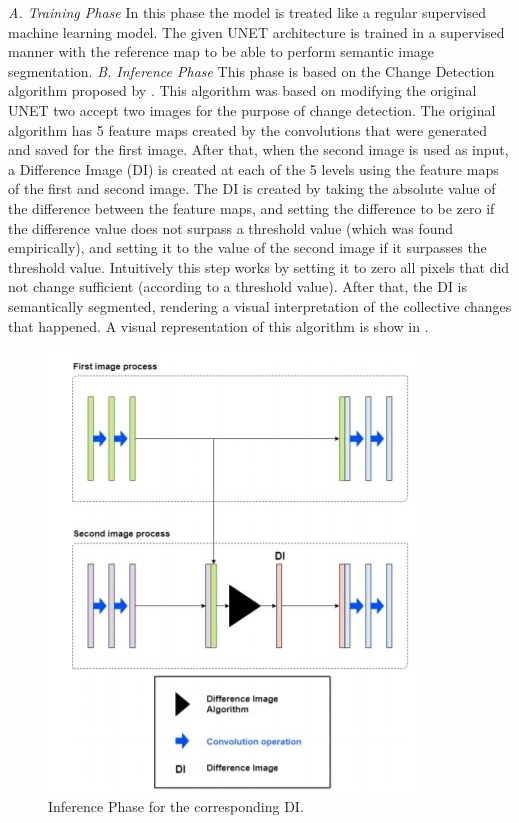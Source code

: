 \textit{A. Training Phase}
\newline
In this phase the model is treated like a regular supervised machine learning model. The given UNET architecture is trained in a supervised manner with the reference map
to be able to perform semantic image segmentation. 
\newline
\textit{B. Inference Phase}
\newline
This phase is based on the Change Detection algorithm proposed by \cite{Kevin}. This algorithm was based on modifying the original UNET two accept two images for the purpose of change detection.
The original algorithm has 5 feature maps created by the convolutions that were generated and saved for the first image. After that, when the second image is used as input, a Difference Image (DI) is
created at each of the 5 levels using the feature maps of the first and second image.
The DI is created by taking the absolute value of the difference between the feature maps, and setting the difference to be zero if the difference value does not surpass a threshold value (which was found empirically), and setting it to 
the value of the second image if it surpasses the threshold value. Intuitively this step works by setting it to zero all pixels that did not change sufficient (according to a threshold value). After that, the DI is semantically segmented, rendering a visual 
interpretation of the collective changes that happened. A visual representation of this algorithm is show in .

\begin{figure}[ht]
    \centering
    \includegraphics{Chapter7/kevin_algorithm.jpg}
    \caption{Inference Phase for the corresponding DI.}
    \label{fig:kevin_algorithm}
\end{figure}

